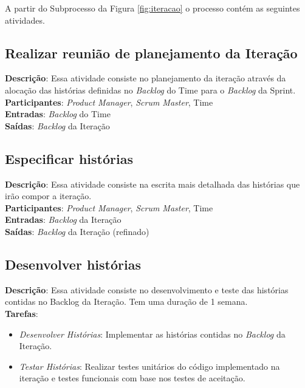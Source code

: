 A partir do Subprocesso da Figura \ref{fig:iteracao} o processo contém as seguintes atividades.

\subsection{Realizar reunião de planejamento da Iteração}
  \textbf{Descrição}: Essa atividade consiste no planejamento da iteração através da alocação das histórias definidas no \textit{Backlog} do Time para o \textit{Backlog} da Sprint. \\
  
  \textbf{Participantes}: \textit{Product Manager}, \textit{Scrum Master}, Time\\
  
  \textbf{Entradas}: \textit{Backlog} do Time \\
  
  \textbf{Saídas}:  \textit{Backlog} da Iteração\\

\subsection{Especificar histórias}
  \textbf{Descrição}: Essa atividade consiste na escrita mais detalhada das histórias que irão compor a 
iteração. \\
  
  \textbf{Participantes}: \textit{Product Manager}, \textit{Scrum Master}, Time\\
  
  \textbf{Entradas}: \textit{Backlog} da Iteração \\
  
  \textbf{Saídas}:   \textit{Backlog} da Iteração (refinado)\\

\subsection{Desenvolver histórias}
  \textbf{Descrição}: Essa atividade consiste no desenvolvimento e teste das histórias contidas no Backlog da Iteração. Tem uma duração de 1 semana. \\
  
  \textbf{Tarefas}: 
  
  \begin{itemize}
    \item \indent \textit{Desenvolver Histórias}: Implementar as histórias contidas no \textit{Backlog} da Iteração.
   
   \item \indent \textit{Testar Histórias}: Realizar testes unitários do código implementado na iteração e testes funcionais
   com base nos testes de aceitação.
  \end{itemize}
  
